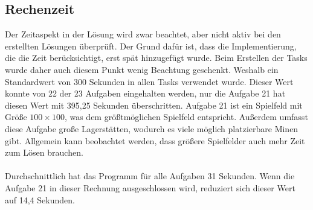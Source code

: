 \subsection*{Rechenzeit}
Der Zeitaspekt in der Lösung wird zwar beachtet, aber nicht aktiv bei den erstellten Lösungen überprüft. Der Grund dafür ist, dass die Implementierung, die die Zeit berücksichtigt, erst spät hinzugefügt wurde. Beim Erstellen der Tasks wurde daher auch diesem Punkt wenig Beachtung geschenkt. Weshalb ein Standardwert von 300 Sekunden in allen Tasks verwendet wurde. Dieser Wert konnte von 22 der 23 Aufgaben eingehalten werden, nur die Aufgabe 21 hat diesen Wert mit 395,25 Sekunden überschritten. 
Aufgabe 21 ist ein Spielfeld mit Größe $100 \times 100$, was dem größtmöglichen Spielfeld entspricht. Außerdem umfasst diese Aufgabe große Lagerstätten, wodurch es viele möglich platzierbare Minen gibt. Allgemein kann beobachtet werden, dass größere Spielfelder auch mehr Zeit zum Lösen brauchen. 
\\\\
Durchschnittlich hat das Programm für alle Aufgaben 31 Sekunden. Wenn die Aufgabe 21 in dieser Rechnung ausgeschlossen wird, reduziert sich dieser Wert auf 14,4 Sekunden.












